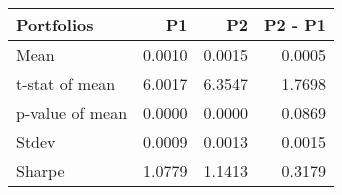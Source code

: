 \begin{tabular}{lrrr}
\toprule
Portfolios & P1 & P2 & P2 - P1 \\
\midrule
Mean & 0.0010 & 0.0015 & 0.0005 \\
t-stat of mean & 6.0017 & 6.3547 & 1.7698 \\
p-value of mean & 0.0000 & 0.0000 & 0.0869 \\
Stdev & 0.0009 & 0.0013 & 0.0015 \\
Sharpe & 1.0779 & 1.1413 & 0.3179 \\
\bottomrule
\end{tabular}
